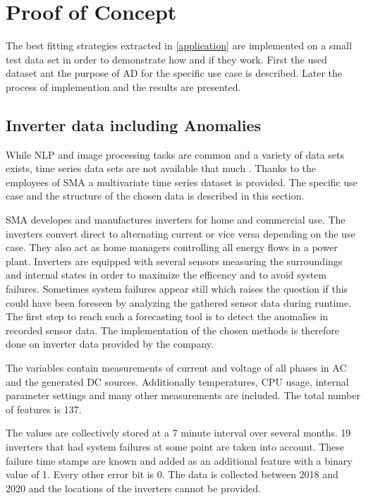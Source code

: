 \section{Proof of Concept}\label{implementation}
The best fitting strategies extracted in \autoref{application} are implemented on a small test data set in order to demonstrate how and if they work. First the used dataset ant the purpose of AD for the specific use case is described. Later the process of implemention and the results are presented.
\subsection{Inverter data including Anomalies}
While NLP and image processing tasks are common and a variety of data sets exists, time series data sets are not available that much \cite{ma_survey_2023}. Thanks to the employees of SMA a multivariate time series dataset is provided. The specific use case and the structure of the chosen data is described in this section.

SMA developes and manufactures inverters for home and commercial use. The inverters convert direct to alternating current or vice versa depending on the use case. They also act as home managers controlling all energy flows in a power plant. Inverters are equipped with several sensors measuring the surroundings and internal states in order to maximize the efficency and to avoid system failures. Sometimes system failures appear still which raises the question if this could have been foreseen by analyzing the gathered sensor data during runtime. The first step to reach such a forecasting tool is to detect the anomalies in recorded sensor data. The implementation of the chosen methods is therefore done on inverter data provided by the company.

The variables contain measurements of current and voltage of all phases in AC and the generated DC sources. Additionally temperatures, CPU usage, internal parameter settings and many other measurements are included. The total number of features is 137.

The values are collectively stored at a 7 minute interval over several months. 19 inverters that had system failures at some point are taken into account. These failure time stamps are known and added as an additional feature with a binary value of 1. Every other error bit is 0. The data is collected between 2018 and 2020 and the locations of the inverters cannot be provided.

